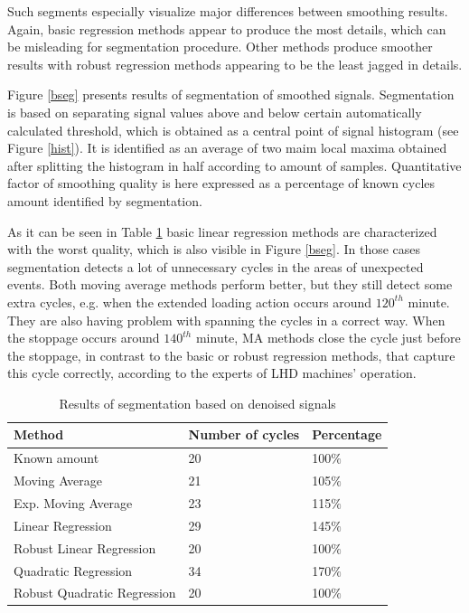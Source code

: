 \documentclass{webofc}
\begin{document}
Such segments especially visualize major differences between smoothing results. Again, basic regression methods appear to produce the most details, which can be misleading for segmentation procedure. Other methods produce smoother results with robust regression methods appearing to be the least jagged in details.

Figure \ref{bseg} presents results of segmentation of smoothed signals. Segmentation is based on separating signal values above and below certain automatically calculated threshold, which is obtained as a central point of signal histogram (see Figure \ref{hist}). It is identified as an average of two maim local maxima obtained after splitting the histogram in half according to amount of samples. Quantitative factor of smoothing quality is here expressed as a percentage of known cycles amount identified by segmentation. 

As it can be seen in Table \ref{tab-1} basic linear regression methods are characterized with the worst quality, which is also visible in Figure \ref{bseg}. In those cases segmentation detects a lot of unnecessary cycles in the areas of unexpected events. Both moving average methods perform better, but they still detect some extra cycles, e.g. when the extended loading action occurs around $120^{th}$ minute. They are also having problem with spanning the cycles in a correct way. When the stoppage occurs around $140^{th}$ minute, MA methods close the cycle just before the stoppage, in contrast to the basic or robust regression methods, that capture this cycle correctly, according to the experts of LHD machines' operation. 

\begin{table}[ht!]
\centering
\caption{Results of segmentation based on denoised signals}
\label{tab-1}       %
\begin{tabular}{lll}
\hline
Method & Number of cycles & Percentage  \\\hline
Known amount & 20 & 100$\%$ \\
Moving Average & 21 & 105$\%$ \\
Exp. Moving Average & 23 & 115$\%$ \\
Linear Regression & 29 & 145$\%$ \\
Robust Linear Regression & 20 & 100$\%$ \\
Quadratic Regression & 34 & 170$\%$ \\
Robust Quadratic Regression & 20 & 100$\%$ \\\hline
\end{tabular}
\end{table}
\end{document}

